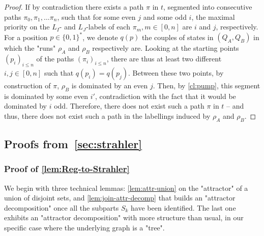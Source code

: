 \documentclass[a4paper,UKenglish,cleveref, autoref, thm-restate]{lipics-v2021}
\renewcommand{\leq}{\leqslant}
\begin{document}
\begin{proof}	
	If by contradiction there exists a path $\pi$ in $t$, segmented into consecutive paths $\pi_0,\pi_1,\dots \pi_n$, such that for some even $j$ and some odd $i$, the maximal priority on the $L_I$- and $L_J$-labels of each $\pi_m, m\in [0,n]$ are $i$ and $j$, respectively. For a position $p\in \{0,1\}^*$, we denote $q(p)$ the couples of states in $(Q_A,Q_B)$ in which the "runs" $\rho_A$ and $\rho_B$ respectively are. Looking at the starting points $(p_i)_{i\leq n}$ of the paths $(\pi_i)_{i\leq n}$, there are thus at least two different $i,j \in [0,n]$ such that $q(p_i) = q(p_j)$. Between these two points, by construction of $\pi$, $\rho_B$ is dominated by an even $j$. Then, by \cref{cl:pump}, this segment is dominated by some even $i'$, contradiction with the fact that it would be dominated by $i$ odd. Therefore, there does not exist such a path $\pi$ in $t$ – and thus, there does not exist such a path in the labellings induced by $\rho_A$ and $\rho_B$.
\end{proof}


\subsection{Proofs from~\cref{sec:strahler}}
\subsubsection*{Proof of \cref{lem:Reg-to-Strahler}}\label{app:Reg-to-Strahler}


We begin with three technical lemmas: \cref{lem:attr-union} on the "attractor" of a union of disjoint sets, and \cref{lem:join-attr-decomp} that builds an "attractor decomposition" once all the subparts $S_k$ have been identified. The last one exhibits an "attractor decomposition" with more structure than usual, in our specific case where the underlying graph is a "tree".
\end{document}
